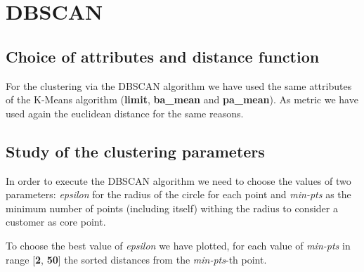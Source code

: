 \section{DBSCAN}
\subsection{Choice of attributes and distance function}

For the clustering via the DBSCAN algorithm we have used the same attributes of the K-Means algorithm (\textbf{limit}, \textbf{ba\_mean} and \textbf{pa\_mean}). As metric we have used again the euclidean distance for the same reasons.

\subsection{Study of the clustering parameters}

In order to execute the DBSCAN algorithm we need to choose the values of two parameters: \textit{epsilon} for the radius of the circle for each point and \textit{min-pts} as the minimum number of points (including itself) withing the radius to consider a customer as core point.

\medskip

To choose the best value of \textit{epsilon} we have plotted, for each value of \textit{min-pts} in range [\textbf{2}, \textbf{50}] the sorted distances from the \textit{min-pts}-th point.

